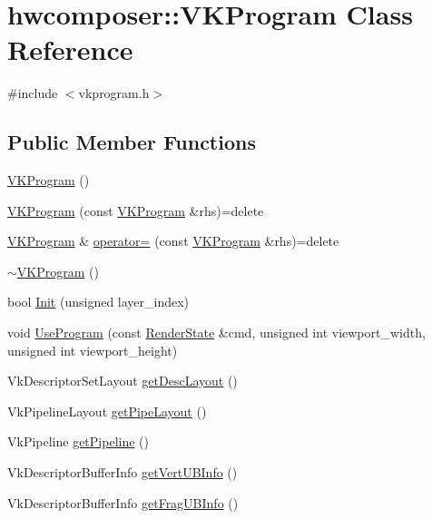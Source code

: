 \hypertarget{classhwcomposer_1_1VKProgram}{}\section{hwcomposer\+:\+:V\+K\+Program Class Reference}
\label{classhwcomposer_1_1VKProgram}


{\ttfamily \#include $<$vkprogram.\+h$>$}

\subsection*{Public Member Functions}
\begin{DoxyCompactItemize}
\item 
\mbox{\hyperlink{classhwcomposer_1_1VKProgram_a15e76c025572a6483de66e0928c3018d}{V\+K\+Program}} ()
\item 
\mbox{\hyperlink{classhwcomposer_1_1VKProgram_aa3ba67bddb96d2a111a5fba945979c4c}{V\+K\+Program}} (const \mbox{\hyperlink{classhwcomposer_1_1VKProgram}{V\+K\+Program}} \&rhs)=delete
\item 
\mbox{\hyperlink{classhwcomposer_1_1VKProgram}{V\+K\+Program}} \& \mbox{\hyperlink{classhwcomposer_1_1VKProgram_acc550b46c8f0bde96cae237a6ca7eca0}{operator=}} (const \mbox{\hyperlink{classhwcomposer_1_1VKProgram}{V\+K\+Program}} \&rhs)=delete
\item 
\mbox{\hyperlink{classhwcomposer_1_1VKProgram_a5bcfa3adeced325075b84c750a28279f}{$\sim$\+V\+K\+Program}} ()
\item 
bool \mbox{\hyperlink{classhwcomposer_1_1VKProgram_a9c39fc6ef39a73ea5a8b7abf3d487f61}{Init}} (unsigned layer\+\_\+index)
\item 
void \mbox{\hyperlink{classhwcomposer_1_1VKProgram_a072cd6d43e404500c842cf120e431c52}{Use\+Program}} (const \mbox{\hyperlink{structhwcomposer_1_1RenderState}{Render\+State}} \&cmd, unsigned int viewport\+\_\+width, unsigned int viewport\+\_\+height)
\item 
Vk\+Descriptor\+Set\+Layout \mbox{\hyperlink{classhwcomposer_1_1VKProgram_ab284e8acd8754df9a126f0e97b0af597}{get\+Desc\+Layout}} ()
\item 
Vk\+Pipeline\+Layout \mbox{\hyperlink{classhwcomposer_1_1VKProgram_a140236dd13e417fd206fb6d05cd29241}{get\+Pipe\+Layout}} ()
\item 
Vk\+Pipeline \mbox{\hyperlink{classhwcomposer_1_1VKProgram_ae3917cbafcab6f16ab5be091e8dc6dad}{get\+Pipeline}} ()
\item 
Vk\+Descriptor\+Buffer\+Info \mbox{\hyperlink{classhwcomposer_1_1VKProgram_ad3769113771d1a8566339ff4e108515c}{get\+Vert\+U\+B\+Info}} ()
\item 
Vk\+Descriptor\+Buffer\+Info \mbox{\hyperlink{classhwcomposer_1_1VKProgram_a1b5dabe3687b3e77567541300ae8a0ae}{get\+Frag\+U\+B\+Info}} ()
\end{DoxyCompactItemize}


